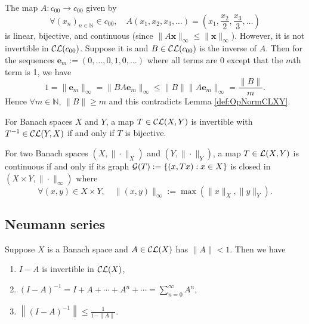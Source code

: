\begin{exm}
  \label{exm:bijectiveButNotInvertible}
  The map $A: c_{00}\rightarrow c_{00}$ given by
  \begin{displaymath}
    \forall (x_n)_{n\in \mathbb{N}} \in c_{00},\quad
    A(x_1, x_2, x_3, \ldots) = (x_1, \frac{x_2}{2}, \frac{x_3}{3}, \ldots)
  \end{displaymath}
  is linear, bijective, and continuous
  (since $\|A\mathbf{x}\|_{\infty}\le \|\mathbf{x}\|_{\infty}$).
  However, it is not invertible in ${\cal CL}(c_{00})$.
  Suppose it is and $B\in{\cal CL}(c_{00})$ is the inverse of $A$.
  Then for the sequences $\mathbf{e}_m:=(0,\ldots,0,1,0,\ldots)$
  where all terms are 0 except that the $m$th term is 1,
  we have
  \begin{displaymath}
    1 = \|\mathbf{e}_m\|_{\infty}
    = \|BA\mathbf{e}_m\|_{\infty}
    \le \|B\|\|A\mathbf{e}_m\|_{\infty}= \frac{\|B\|}{m}.
  \end{displaymath}
  Hence $\forall m\in \mathbb{N}$, $\|B\|\ge m$
  and this contradicts Lemma \ref{def:OpNormCLXY}.
\end{exm}

\begin{thm}[Banach]
  \label{thm:bijectiveCLmapBetweenBanachSpacesIsInvertible}
  For Banach spaces $X$ and $Y$, 
  a map $T\in {\cal CL}(X,Y)$
  is invertible with $T^{-1}\in {\cal CL}(Y,X)$
  if and only if $T$ is bijective.
\end{thm}

\begin{thm}
  \label{thm:closedGraph}
  For two Banach spaces $(X,\|\cdot\|_X)$ and $(Y,\|\cdot\|_Y)$,
  a map $T\in {\cal L}(X,Y)$ is continuous
  if and only if its graph ${\cal G}(T) := \{(x,Tx): x\in X\}$
  is closed
  in $(X\times Y, \|\cdot\|_{\infty})$
  where 
  \begin{equation}
    \label{eq:productInftyNorm}
    \forall (x,y)\in X\times Y,\quad
    \|(x,y)\|_{\infty}:=\max(\|x\|_X,\|y\|_Y).
  \end{equation}
\end{thm}

\subsection{Neumann series}
\label{sec:series-operators}

\begin{thm}
  \label{thm:NeumannSeries}
  Suppose $X$ is a Banach space
  and $A\in {\cal CL}(X)$ has $\|A\|<1$.
  Then we have
  \begin{enumerate}[(NST-1)]\itemsep0em
  \item $I-A$ is invertible in ${\cal CL}(X)$,
  \item $(I-A)^{-1}=I + A + \cdots + A^n +\cdots
    = \sum_{n=0}^{\infty} A^n$, 
  \item $\left\|(I-A)^{-1}\right\| \le \frac{1}{1-\|A\|}$.
  \end{enumerate}
\end{thm}

